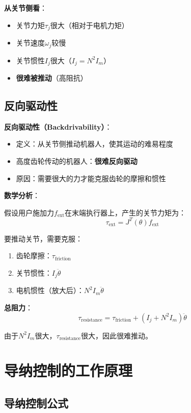 \documentclass[12pt,a4paper]{article}
\begin{document}
\textbf{从关节侧看}：
\begin{itemize}
\item 关节力矩$\tau_j$很大（相对于电机力矩）
\item 关节速度$\omega_j$较慢
\item 关节惯性$I_j$很大（$I_j = N^2 I_m$）
\item \textbf{很难被推动}（高阻抗）
\end{itemize}

\subsection{反向驱动性}

\textbf{反向驱动性（Backdrivability）}：
\begin{itemize}
\item 定义：从关节侧推动机器人，使其运动的难易程度
\item 高度齿轮传动的机器人：\textbf{很难反向驱动}
\item 原因：需要很大的力才能克服齿轮的摩擦和惯性
\end{itemize}

\textbf{数学分析}：

假设用户施加力$f_{\text{ext}}$在末端执行器上，产生的关节力矩为：
\begin{equation}
\tau_{\text{ext}} = J^T(\theta) f_{\text{ext}}
\end{equation}

要推动关节，需要克服：
\begin{enumerate}
\item 齿轮摩擦：$\tau_{\text{friction}}$
\item 关节惯性：$I_j \ddot{\theta}$
\item 电机惯性（放大后）：$N^2 I_m \ddot{\theta}$
\end{enumerate}

\textbf{总阻力}：
\begin{equation}
\tau_{\text{resistance}} = \tau_{\text{friction}} + (I_j + N^2 I_m)\ddot{\theta}
\end{equation}

由于$N^2 I_m$很大，$\tau_{\text{resistance}}$很大，因此很难推动。

\section{导纳控制的工作原理}

\subsection{导纳控制公式}
\end{document}
